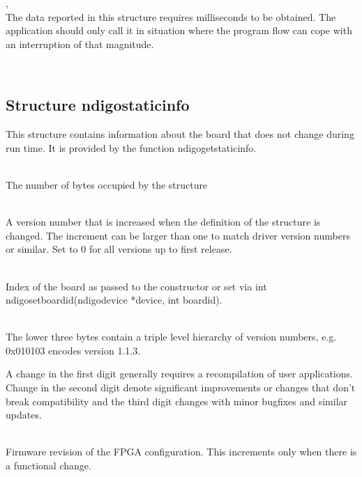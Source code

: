 			, \\
			The data reported in this structure requires milliseconds to be obtained. The application should only call it in situation where the program flow can cope with an interruption of that magnitude.
		
		\\
		\subsection{Structure ndigo\tu static\tu info}
		
			This structure contains information about the board that does not change during run time. It is provided by the function \textsf{ndigo\tu get\tu static\tu info}.\par
			
			\\
			The number of bytes occupied by the structure\par

			\\
			A version number that is increased when the definition of the structure is changed. The increment can be larger than one to match driver version numbers or similar. Set to 0 for all versions up to first release.\par

			\\
			Index of the board as passed to the constructor or set via \textsf{int ndigo\tu set\tu board\tu id(ndigo\tu device *device, int board\tu id)}.\par
			
			\\
			The lower three bytes contain a triple level hierarchy of version numbers, e.g. 0x010103 encodes version 1.1.3.\par

			A change in the first digit generally requires a recompilation of user applications. Change in the second digit denote significant improvements or changes that don't break compatibility and the third digit changes with minor bugfixes and similar updates.\par

			\\
			Firmware revision of the FPGA configuration. This increments only when there is a functional change.\par

